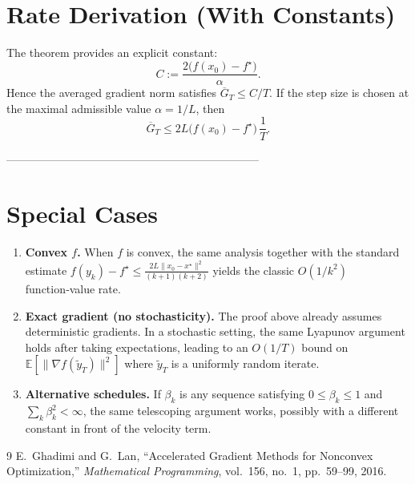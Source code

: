 \documentclass{article}
\newcommand{\E}{\mathbb{E}}
\begin{document}
\section*{Rate Derivation (With Constants)}
The theorem provides an explicit constant:
\[
C:=\frac{2\bigl(f(x_0)-f^\star\bigr)}{\alpha}.
\]
Hence the averaged gradient norm satisfies $\overline{G}_T\le C/T$.  
If the step size is chosen at the maximal admissible value $\alpha=1/L$, then
\[
\overline{G}_T\le 2L\bigl(f(x_0)-f^\star\bigr)\,\frac{1}{T}.
\]

--------------------------------------------------------------------

\section*{Special Cases}
\begin{enumerate}
\item \textbf{Convex $f$.} When $f$ is convex, the same analysis together with the standard estimate $f(y_k)-f^\star\le\frac{2L\|x_0-x^\star\|^2}{(k+1)(k+2)}$ yields the classic $O(1/k^2)$ function‑value rate.

\item \textbf{Exact gradient (no stochasticity).} The proof above already assumes deterministic gradients. In a stochastic setting, the same Lyapunov argument holds after taking expectations, leading to an $O(1/T)$ bound on $\E[\|\nabla f(\tilde y_T)\|^2]$ where $\tilde y_T$ is a uniformly random iterate.

\item \textbf{Alternative schedules.} If $\beta_k$ is any sequence satisfying $0\le\beta_k\le1$ and $\sum_{k}\beta_k^2<\infty$, the same telescoping argument works, possibly with a different constant in front of the velocity term.
\end{enumerate}

\begin{thebibliography}{9}
E.~Ghadimi and G.~Lan, ``Accelerated Gradient Methods for Nonconvex
  Optimization,'' \emph{Mathematical Programming}, vol.~156, no.~1,
  pp.~59--99, 2016.
\end{thebibliography}
\end{document}
